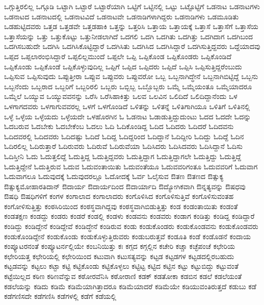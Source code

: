 {ಒಗ್ಗುತ್ತಿರಲಿಲ್ಲ
ಒಗ್ಗೂಡಿ
ಒಟ್ಟಾಗಿ
ಒಟ್ಟಾರೆ
ಒಟ್ಟಾರೆಯಾಗಿ
ಒಟ್ಟಿಗೆ
ಒಟ್ಟಿನಲ್ಲಿ
ಒಟ್ಟು
ಒಟ್ಟೊಟ್ಟಿಗೆ
ಒಡನಾಟ
ಒಡನಾಟಗಳು
ಒಡನಾಟದ
ಒಡನಾಟದಲ್ಲಿ
ಒಡನಾಟವಿದೆ
ಒಡನಾಟವೇ
ಒಡನಾಡಿಗಳಾಗಿದ್ದರು
ಒಡನಾಡಿಗಳು
ಒಡಮೂಡಿತು
ಒಡಹುಟ್ಟಿದವರು
ಒತ್ತಡ
ಒತ್ತಡವೇ
ಒತ್ತಡಹಾಕಿ
ಒತ್ತನ್ನು
ಒತ್ತರಿಸಿ
ಒತ್ತಾಯ
ಒತ್ತಾಯಕ್ಕೆ
ಒತ್ತಾಸೆ
ಒತ್ತಾಸೆಗೆ
ಒತ್ತಾಸೆಯ
ಒತ್ತಾಸೆಯನ್ನು
ಒತ್ತು
ಒತ್ತುಕೊಟ್ಟು
ಒತ್ತುನೀಡಲಾಗಿದೆ
ಒದಗಲಿ
ಒದಗಿ
ಒದಗಿತು
ಒದಗಿತ್ತು
ಒದಗಿದಾಗ
ಒದಗಿಬಂದ
ಒದಗಿಸಬಹುದೇ
ಒದಗಿಸಿ
ಒದಗಿಸಿಕೊಟ್ಟಿದ್ದಾರೆ
ಒದಗಿಸಿತು
ಒದಗಿಸಿದ
ಒದಗಿಸಿದ್ದಾರೆ
ಒದಗಿಸುತ್ತಿದ್ದವರು
ಒದ್ದೆಯಾದವು
ಒಪ್ಪದ
ಒಪ್ಪಲಾರಂಭಿಸಿದ್ದಾರೆ
ಒಪ್ಪಲಿಲ್ಲಮುಂದೆ
ಒಪ್ಪಲೇ
ಒಪ್ಪಿ
ಒಪ್ಪಿಕೊಂಡ
ಒಪ್ಪಿಕೊಂಡರು
ಒಪ್ಪಿಕೊಂಡಿದೆ
ಒಪ್ಪಿಕೊಂಡು
ಒಪ್ಪಿಕೊಂಡೆ
ಒಪ್ಪಿಕೊಳ್ಳುವುದಿಲ್ಲ
ಒಪ್ಪಿಗೆ
ಒಪ್ಪಿದ
ಒಪ್ಪಿದರು
ಒಪ್ಪಿದೆ
ಒಪ್ಪಿಸಿ
ಒಪ್ಪಿಸುತ್ತಿದ್ದರೆಂಬುದು
ಒಪ್ಪಿಸುವ
ಒಪ್ಪಿಸುವುದು
ಒಪ್ಪುತ್ತೀರಾ
ಒಪ್ಪುವ
ಒಪ್ಪುವರು
ಒಪ್ಪುವರೋ
ಒಬ್ಬ
ಒಬ್ಬನಾಗಿದ್ಧೇನೆ
ಒಬ್ಬನಾಗಿಬಿಟ್ಟಿದ್ದೆ
ಒಬ್ಬನು
ಒಬ್ಬನೆಂದು
ಒಬ್ಬರಾದ
ಒಬ್ಬರಿಗೆ
ಒಬ್ಬರಿರಲಿ
ಒಬ್ಬರು
ಒಬ್ಬಿಬ್ಬ
ಒಬ್ಬೊಬ್ಬರು
ಒಮ್ಮೆ
ಒಮ್ಮೆಯಂತೂ
ಒಮ್ಮೆಯಾದರೂ
ಒಮ್ಮೆಲೆ
ಒಯ್ಯುವ
ಒಯ್ಯುವವನನ್ನು
ಒರೆಸಿ
ಒರೆಸಿಹಾಕಿತ್ತು
ಒಲವ
ಒಲವಿನ
ಒಲಿದಿದೆ
ಒಲಿದಿದ್ದಾನೆಂದು
ಒಳ
ಒಳಗಾಗದವರು
ಒಳಗಾಗುವವರಲ್ಲ
ಒಳಗೆ
ಒಳಗೊಂಡಿದೆ
ಒಳಿತನ್ನು
ಒಳಿತನ್ನೆ
ಒಳಿತಿಗಾಗಿಯೂ
ಒಳಿತಿಗೆ
ಒಳಿತಿನಲ್ಲಿ
ಒಳ್ಳೆ
ಒಳ್ಳೆಯ
ಒಳ್ಳೆಯದು
ಒಳ್ಳೆಯದೇ
ಒಳಹೊರಗಿನ
ಓ
ಓಡನಾಟ
ಓಡಾಡುತ್ತಿದ್ದುದುಂಟು
ಓದದ
ಓದದೇ
ಓದನ್ನು
ಓದಬರುವ
ಓದಬೇಕು
ಓದಬೇಕೆಂಬ
ಓದಲು
ಓದಿ
ಓದಿಕೊಂಡಿದ್ದ
ಓದಿದ
ಓದಿದರು
ಓದಿದರೆ
ಓದಿದವನು
ಓದಿದವರಲ್ಲಿ
ಓದಿದವರು
ಓದಿದಷ್ಟು
ಓದಿದೆ
ಓದಿದ್ದ
ಓದಿದ್ದರಿಂದ
ಓದಿದ್ದಾನೆ
ಓದಿದ್ದೀರಿ
ಓದಿದ್ದು
ಓದಿದ್ದೆ
ಓದಿನ
ಓದಿರಲಿಲ್ಲ
ಓದಿರುತ್ತಾರೆ
ಓದಿರುವರು
ಓದಿರುವೆ
ಓದಿರುವೆಯಾ
ಓದಿಸಿದರು
ಓದಿಸಿದವರು
ಓದಿಸಿದ್ದಾನೆ
ಓದಿಸು
ಓದಿಸ್ತೀನಿ
ಓದು
ಓದುತ್ತಲಿದ್ದೆ
ಓದುತ್ತಿದ್ದ
ಓದುತ್ತಿದ್ದವರು
ಓದುತ್ತಿದ್ದಾಗ
ಓದುತ್ತಿದ್ದಾಗಲೇ
ಓದುತ್ತಿದ್ದು
ಓದುತ್ತಿದ್ದೆ
ಓದುತ್ತಿದ್ದೇನೆ
ಓದುತ್ತಿರುವ
ಓದುವ
ಓದುವಂತಾಯಿತು
ಓದುವಂತೆಯೂ
ಓದುವವರಿಗಂತೂ
ಓದುವವರಿಗೆ
ಓದುವಾಗ
ಓದುವಾಗಲೂ
ಓದುವುದಕ್ಕೆ
ಓದುವುದರಲ್ಲೂ
ಓದೋದಕ್ಕೆ
ಓರ್ವ
ಓಲೈಸುವ
ಔತಣ
ಔತಣದ
ಔತ್ಸುಕ್ಯ
ಔತ್ಸುಕ್ಯಮೋಹಾರತಿದಾನ್
ಔದಾರ್ಯ
ಔದಾರ್ಯದಿಂದ
ಔದಾರ್ಯಾದಿ
ಔದ್ಯೋಗಿಕವಾಗಿ
ಔನ್ನತ್ಯವನ್ನು
ಔಷಧವು
ಔಷಧಿ
ಔಷಧಿಗಳಿಗೆ
ಕಂಗಳ
ಕಂಗಾಲಾದ
ಕಂಗಾಲಾದರು
ಕಂಗೊಳಿಸಿದ
ಕಂಗೊಳಿಸುತ್ತಿವೆ
ಕಂಗೊಳಿಸುವಂತಹ
ಕಂಗೋಳಿಸುತ್ತಿತ್ತು
ಕಂಠಸಿರಿಯಿಂದ
ಕಂಠಸ್ಥವಾಗಿದ್ದವು
ಕಂಠಸ್ಥವಾಗಿಬಿಡುತ್ತಿತ್ತು
ಕಂಡ
ಕಂಡಂತಾಯಿತು
ಕಂಡಂತೆ
ಕಂಡತಕ್ಷಣ
ಕಂಡದ್ದು
ಕಂಡರು
ಕಂಡರೆ
ಕಂಡಲ್ಲಿ
ಕಂಡಳು
ಕಂಡವನು
ಕಂಡವರು
ಕಂಡಾಗ
ಕಂಡಿತ್ತು
ಕಂಡಿದ್ದ
ಕಂಡಿದ್ದಾರೆ
ಕಂಡಿದ್ದು
ಕಂಡಿದ್ದೇನೆ
ಕಂಡಿದ್ದೇವೆ
ಕಂಡಿದ್ಧೇನೆ
ಕಂಡಿರುವ
ಕಂಡು
ಕಂಡುಕೊಂಡರು
ಕಂಡುಕೊಂಡವನು
ಕಂಡುಕೊಂಡವರು
ಕಂಡುಕೊಂಡಿದ್ದೇನೆ
ಕಂಡುಕೊಂಡು
ಕಂಡುಕೊಳ್ಳುತ್ತಿರುವರು
ಕಂಡುಬರುತ್ತವೆ
ಕಂಡೂತಿ
ಕಂಡೆ
ಕಂಡೊಡನೆ
ಕಂದಾಯ
ಕಂಪ್ಯೂಟರನಂತೆ
ಕಂಪ್ಯೂಟರ್ನಲ್ಲಿಯೇ
ಕಂಬನಿಯಿತ್ತು
ಕಃ
ಕಗ್ಗದ
ಕಗ್ಗಲ್ಲಿನ
ಕಚೇರಿ
ಕಚ್ಚಾ
ಕಚ್ಛೆಪಂಚೆ
ಕಛೇರಿಯ
ಕಛೇರಿಯತ್ತ
ಕಛೇರಿಯಲ್ಲಿ
ಕಛೇರಿಯಿಂದ
ಕಟುವಾಗಿ
ಕಟುಸತ್ಯವನ್ನು
ಕಟ್ಟಡ
ಕಟ್ಟಡಗಳ
ಕಟ್ಟಡದಲ್ಲಿರಬಹುದು
ಕಟ್ಟಡವನ್ನು
ಕಟ್ಟಲು
ಕಟ್ಟಾ
ಕಟ್ಟಿ
ಕಟ್ಟಿಕೊಂಡು
ಕಟ್ಟಿಕೊಳ್ಳಲು
ಕಟ್ಟಿಟ್ಟ
ಕಟ್ಟಿದ
ಕಟ್ಟಿನ
ಕಟ್ಟು
ಕಟ್ಟುಬಿದ್ದು
ಕಟ್ಟುವಂತೆ
ಕಟ್ಟೆಯಿಲ್ಲದ
ಕಠಿಣ
ಕಠಿಣವೆನ್ನುವ
ಕಠೋರವೆನಿಸಿ
ಕಠೋರಾಣಿ
ಕಡಕ್
ಕಡತೋಕಾ
ಕಡಬಿನ
ಕಡಲೆ
ಕಡಲೆಯಂತೆ
ಕಡಲೆಯನ್ನು
ಕಡಿದು
ಕಡಿಮೆ
ಕಡಿಮೆಯಾಗಿತ್ತಾದರೂ
ಕಡಿಮೆಯಾದರೆ
ಕಡಿಮೆಯೇ
ಕಡಿಯುವಂತಿರುತ್ತದೆ
ಕಡುಬು
ಕಡೆ
ಕಡೆಗಣಿಸದೇ
ಕಡೆಗಣಿಸಿ
ಕಡೆಗಳಲ್ಲಿ
ಕಡೆಗೆ
ಕಡೆಯಲ್ಲಿ
}
